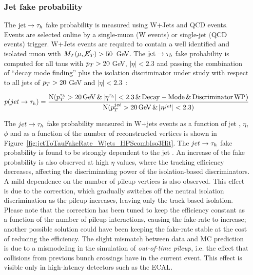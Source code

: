 \subsubsection{Jet fake probability}

The $\mathrm{jet} \rightarrow \tau_h$ fake probability is measured using W+Jets and QCD events. Events are selected online by a single-muon (W events) or single-jet (QCD events) trigger. W+Jets events are required to contain a well identified and isolated muon with $M_T(\mu, \cancel{E}_T) > 50$~GeV. The $\mathrm{jet} \rightarrow \tau_h$ fake probability is computed for all taus with $p_{T} > 20$ GeV, $|\eta| < 2.3$ and passing the combination of ``decay mode finding'' plus the isolation discriminator under study with respect to all jets of $p_{T} > 20$ GeV and $|\eta| < 2.3$~\cite{DP-14-015}:

\begin{equation}
 p(jet \rightarrow \tau_h) = \dfrac{\operatorname{N}(p_{T}^{\tau_h} > 20\, \mathrm{GeV} \, \& \, |\eta^{\tau_h}| < 2.3 \, \& \, \mathrm{Decay-Mode} \, \& \, \mathrm{Discriminator\,WP})}{\operatorname{N}(p_{T}^{jet} > 20\, \mathrm{GeV} \, \& \, |\eta^{jet}| < 2.3)}
\end{equation}

The $jet \rightarrow \tau_h$ fake probability measured in W+jets events as a function of jet \pT, $\eta$, $\phi$ and as a function of the number of reconstructed vertices is shown in Figure~\ref{fig:jetToTauFakeRate_Wjets_HPScombIso3Hit}. The $jet \rightarrow \tau_h$ fake probability is found to be strongly dependent to the jet \pT. An increase of the fake probability is also observed at high $\eta$ values, where the tracking efficiency decreases, affecting the discriminating power of the isolation-based discriminators. A mild dependence on the number of pileup vertices is also observed. This effect is due to the \db correction, which gradually switches off the neutral isolation discrimination as the pileup increases, leaving only the track-based isolation. Please note that the \db correction has been tuned to keep the efficiency constant as a function of the number of pileup interactions, causing the fake-rate to increase; another possible solution could have been keeping the fake-rate stable at the cost of reducing the efficiency. The slight mismatch between data and MC prediction is due to a mismodeling in the simulation of \emph{out-of-time pileup}, i.e. the effect that collisions from previous bunch crossings have in the current event. This effect is visible only in high-latency detectors such as the ECAL.


